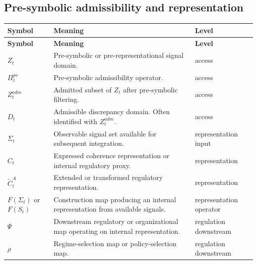 \documentclass[11pt,a4paper]{article}
\begin{document}
	\subsection{Pre-symbolic admissibility and representation}
	
	\begin{longtable}{>{\RaggedRight\arraybackslash}p{}
			>{\RaggedRight\arraybackslash}p{}
			>{\RaggedRight\arraybackslash}p{}}
		\toprule
		\textbf{Symbol} & \textbf{Meaning} & \textbf{Level} \\
		\midrule
		\endfirsthead
		\toprule
		\textbf{Symbol} & \textbf{Meaning} & \textbf{Level} \\
		\midrule
		\endhead
		
		$Z_t$ & Pre-symbolic or pre-representational signal domain. & access \\
		
		$\Pi_t^{ps}$ & Pre-symbolic admissibility operator. & access \\
		
		$Z_t^{adm}$ & Admitted subset of $Z_t$ after pre-symbolic filtering. & access \\
		
		$D_t$ & Admissible discrepancy domain. Often identified with $Z_t^{adm}$. & access \\
		
		$\Sigma_t$ & Observable signal set available for subsequent integration. & representation input \\
		
		$\widehat{C}_t$ & Expressed coherence representation or internal regulatory proxy. & representation \\
		
		$\widetilde{C}_t^A$ & Extended or transformed regulatory representation. & representation \\
		
		$F(\Sigma_t)$ or $F(S_t)$ & Construction map producing an internal representation from available signals. & representation operator \\
		
		$\Psi$ & Downstream regulatory or organizational map operating on internal representation. & regulation downstream \\
		
		$\rho$ & Regime-selection map or policy-selection map. & regulation downstream \\
		
		\bottomrule
	\end{longtable}
	
\end{document}
